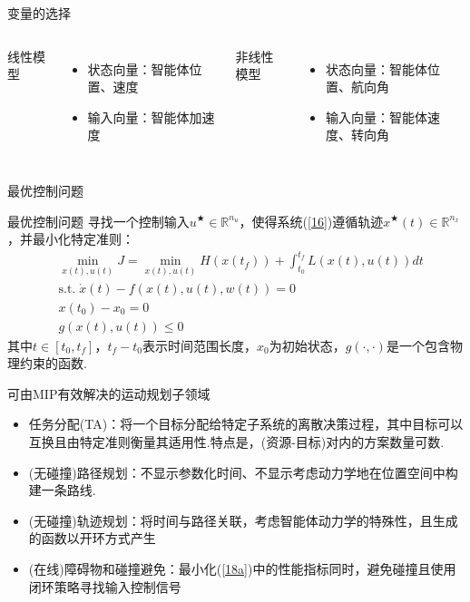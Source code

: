 \documentclass[notheorems,11pt]{beamer}
\theoremstyle{plain}
\numberwithin{theorem}{section}
\numberwithin{lemma}{section}
\numberwithin{corollary}{section}
\theoremstyle{example}
\begin{document}
\begin{frame}{变量的选择}
  \begin{columns}[t]
  线性模型
  \begin{itemize}
    \item 状态向量：智能体位置、速度
    \item 输入向量：智能体加速度
  \end{itemize}
  非线性模型
  \begin{itemize}
    \item 状态向量：智能体位置、航向角
    \item 输入向量：智能体速度、转向角
  \end{itemize}
  \end{columns}

\end{frame}

\begin{frame}{最优控制问题}
  \begin{block}{最优控制问题}
    寻找一个控制输入$u^\bigstar\in\mathbb{R}^{n_u}$，使得系统(\ref{16})遵循轨迹$x^\bigstar(t)$$\in\mathbb{R}^{n_x}$，并最小化特定准则：
    \begin{subequations}
      \begin{align}
        &\min_{x(t),u(t)}J=\min_{x(t),u(t)}H \left(x(t_f)\right)+\int_{t_0}^{t_f}{L(x(t),u(t))dt}\label{18a}\\
        &\mathrm{s.t.}\; \dot{x}(t)-f(x(t),u(t),w(t))=0 \\
        &x(t_0)-x_0=0 \\
        &g \left(x(t),u(t)\right) \leqslant 0
      \end{align}
    \end{subequations}
    其中$t\in[t_0,t_f]$，$t_f-t_0$表示时间范围长度，$x_0$为初始状态，$g(\cdot,\cdot)$是一个包含物理约束的函数.
  \end{block}
\end{frame}

\begin{frame}{可由MIP有效解决的运动规划子领域}
  \begin{itemize}
    \item 任务分配(TA)：将一个目标分配给特定子系统的离散决策过程，其中目标可以互换且由特定准则衡量其适用性.特点是，(资源-目标)对内的方案数量可数.
    \item (无碰撞)路径规划：不显示参数化时间、不显示考虑动力学地在位置空间中构建一条路线.
    \item (无碰撞)轨迹规划：将时间与路径关联，考虑智能体动力学的特殊性，且生成的函数以开环方式产生
    \item (在线)障碍物和碰撞避免：最小化(\ref{18a})中的性能指标同时，避免碰撞且使用闭环策略寻找输入控制信号
  \end{itemize}
\end{frame}
\end{document}
